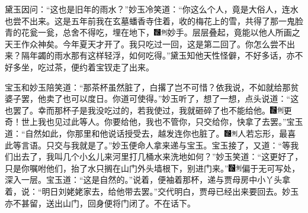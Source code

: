 黛玉因问：“这也是旧年的雨水？”妙玉冷笑道：“你这么个人，竟是大俗人，连水也尝不出来。这是五年前我在玄墓蟠香寺住着，收的梅花上的雪，共得了那一鬼脸青的花瓮一瓮，总舍不得吃，埋在地下，{\includegraphics[width=3mm]{../Images/00006}\includegraphics[width=3mm]{../Images/00011}\footnotesize \kaishu 妙手。层层叠起，竟能以他人所画之天王作众神矣。}今年夏天才开了。我只吃过一回，这是第二回了。你怎么尝不出来？隔年蠲的雨水那有这样轻浮，如何吃得。”黛玉知他天性怪僻，不好多话，亦不好多坐，吃过茶，便约着宝钗走了出来。

宝玉和妙玉陪笑道：“那茶杯虽然脏了，白撂了岂不可惜？依我说，不如就给那贫婆子罢，他卖了也可以度日。你道可使得。”妙玉听了，想了一想，点头说道：“这也罢了。幸而那杯子是我没吃过的，若我使过，我就砸碎了也不能给他。{\includegraphics[width=3mm]{../Images/00006}\includegraphics[width=3mm]{../Images/00011}\footnotesize \kaishu 更奇！世上我也见过此等人。}你要给他，我也不管你，只交给你，快拿了去罢。”宝玉道：“自然如此，你那里和他说话授受去，越发连你也脏了。{\includegraphics[width=3mm]{../Images/00006}\includegraphics[width=3mm]{../Images/00011}\footnotesize \kaishu 人若忘形，最喜此等言语。}只交与我就是了。”妙玉便命人拿来递与宝玉。宝玉接了，又道：“等我们出去了，我叫几个小幺儿来河里打几桶水来洗地如何？”妙玉笑道：“这更好了，只是你嘱咐他们，抬了水只搁在山门外头墙根下，别进门来。”{\includegraphics[width=3mm]{../Images/00006}\includegraphics[width=3mm]{../Images/00011}\footnotesize \kaishu 偏于无可写处，深入一层。}宝玉道：“这是自然的。”说着，便袖着那杯，递与贾母房中小丫头拿着，说：“明日刘姥姥家去，给他带去罢。”交代明白，贾母已经出来要回去。妙玉亦不甚留，送出山门，回身便将门闭了。不在话下。

